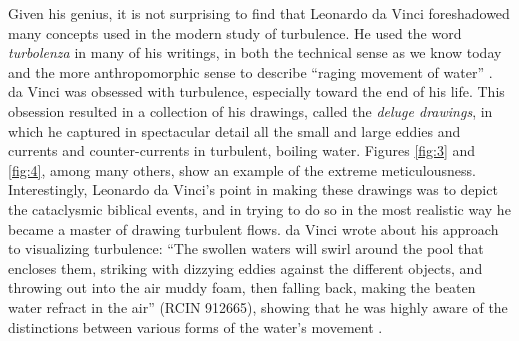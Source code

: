 \documentclass[12pt]{article}
\begin{document}
Given his genius, it is not surprising to find that Leonardo da Vinci foreshadowed many concepts used in the modern study of turbulence. He used the word \textit{turbolenza} in many of his writings, in both the technical sense as we know today and the more anthropomorphic sense to describe ``raging movement of water'' \cite{marusic2021leonardo}. da Vinci was obsessed with turbulence, especially toward the end of his life. This obsession resulted in a collection of his drawings, called the \textit{deluge drawings}, in which he captured in spectacular detail all the small and large eddies and currents and counter-currents in turbulent, boiling water. Figures \ref{fig:3} and \ref{fig:4}, among many others, show an example of the extreme meticulousness. Interestingly, Leonardo da Vinci's  point in making these drawings was to depict the cataclysmic biblical events, and in trying to do so in the most realistic way he became a master of drawing turbulent flows. da Vinci wrote about his approach to visualizing turbulence: ``The swollen waters will swirl around the pool that
encloses them, striking with dizzying eddies against the different objects, and throwing out into the air muddy foam, then falling back, making the beaten water refract in the air'' (RCIN 912665), showing that he was highly aware of the distinctions between various forms of the  water's movement \cite{marusic2021leonardo}. \\
\end{document}
